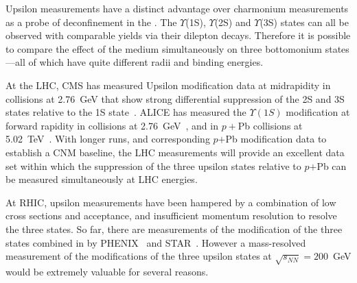
Upsilon measurements have a distinct advantage over charmonium
measurements as a probe of deconfinement in the \qgp. 
The $\Upsilon$(1S), $\Upsilon$(2S) and $\Upsilon$(3S) states can all be
observed with comparable yields via their dilepton decays. Therefore
it is possible to compare the effect of the medium simultaneously on
three bottomonium states---all of which have quite different radii and
binding energies.

At the LHC, CMS has measured Upsilon modification data at midrapidity in \pbpb collisions at 2.76~GeV
that show strong differential suppression of the 2S and 3S states
relative to the 1S state~\cite{Chatrchyan:2012lxa}. ALICE has measured the $\Upsilon(1S)$
modification at forward rapidity in \pbpb collisions at 2.76~GeV~\cite{Abelev:2014nua}, and in $p+$Pb collisions
at 5.02~TeV~\cite{Abelev:2014oea}. With longer \pbpb
runs, and corresponding $p$$+$Pb modification data to establish a CNM baseline, the LHC measurements
will provide an excellent data set within which the suppression of the
three upsilon states relative to $p$$+$Pb can be measured
simultaneously at LHC energies.

At RHIC, upsilon measurements have been hampered by a combination
of low cross sections and acceptance, and insufficient momentum
resolution to resolve the three states. So far, there are 
measurements of the modification of the three states combined in \auau by
PHENIX~\cite{Adare:2014hje} and STAR~\cite{Adamczyk:2013poh}.  However a mass-resolved
measurement of the modifications of the three upsilon states at
$\sqrt{s_{NN}} = 200$~GeV would be extremely valuable for several
reasons.

